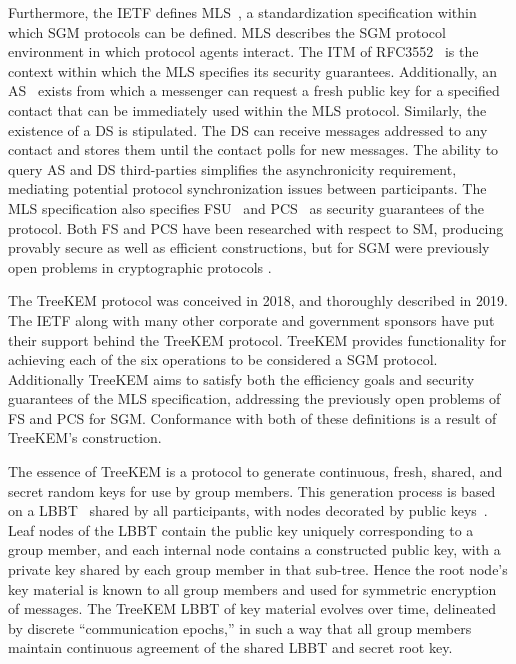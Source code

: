 \documentclass[authordraft,sigconf]{acmart}
\newcommand{\Abrev}[1]{\gls{#1}}
\begin{document}
Furthermore, the \Abrev{IETF} defines \Abrev{MLS}\ \cite{Omara2020}, a standardization specification within which \Abrev{SGM} protocols can be defined.
\Abrev{MLS} describes the \Abrev{SGM} protocol environment in which protocol agents interact.
The \Abrev{ITM} of RFC3552~\cite{rescorla2003rfc3552} is the context within which the \Abrev{MLS} specifies its security guarantees.
Additionally, an \Abrev{AS}~\cite{perlman1999overview} exists from which a messenger can request a fresh public key for a specified contact that can be immediately used within the \Abrev{MLS} protocol.
Similarly, the existence of a \Abrev{DS} is stipulated. 
The \Abrev{DS} can receive messages addressed to any contact and stores them until the contact polls for new messages.
The ability to query \Abrev{AS} and \Abrev{DS} third-parties simplifies the asynchronicity requirement, mediating potential protocol synchronization issues between participants.
The \Abrev{MLS} specification also specifies \Abrev{FSU}~\cite{Omara2020} and \Abrev{PCS}~\cite{cohn2016post} as security guarantees of the protocol.
Both \Abrev{FS} and \Abrev{PCS} have been researched with respect to \Abrev{SM}, producing provably secure as well as efficient constructions, but for \Abrev{SGM} were previously open problems in cryptographic protocols .

The TreeKEM protocol \cite{bhargavan:hal-02425247} was conceived in 2018, and thoroughly described in 2019.
The \Abrev{IETF} along with many other corporate and government sponsors have put their support behind the TreeKEM protocol.
TreeKEM provides functionality for achieving each of the six operations to be considered a \Abrev{SGM} protocol.
Additionally TreeKEM aims to satisfy both the efficiency goals and security guarantees of the \Abrev{MLS} specification, addressing the previously open problems of \Abrev{FS} and \Abrev{PCS} for \Abrev{SGM}.
Conformance with both of these definitions is a result of TreeKEM's construction.

The essence of TreeKEM is a protocol to generate continuous, fresh, shared, and secret random keys for use by group members.
This generation process is based on a \Abrev{LBBT}~\cite{baerentzen2003left} shared by all participants, with nodes decorated by public keys~\cite{rfc4949}.
Leaf nodes of the \Abrev{LBBT} contain the public key uniquely corresponding to a group member, and each 
internal node contains a constructed public key, with a private key shared by each group member in that sub-tree.
Hence the root node's key material is known to all group members and used for symmetric encryption of messages.
The TreeKEM \Abrev{LBBT} of key material evolves over time, delineated by discrete ``communication epochs,'' in such a way that all group members maintain continuous agreement of the shared \Abrev{LBBT} and secret root key.
\end{document}
